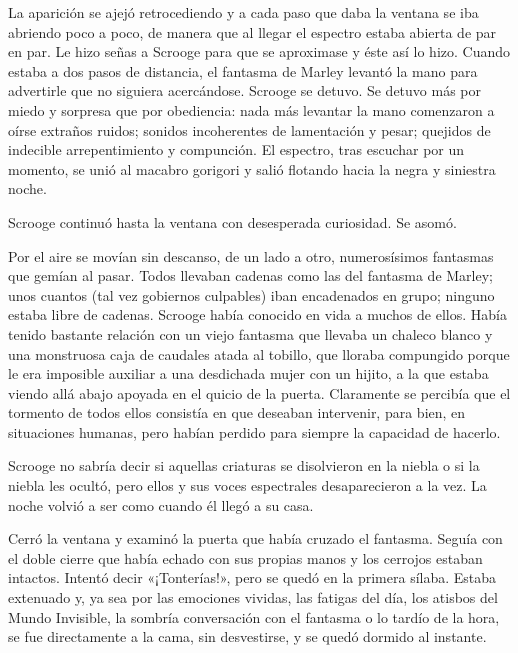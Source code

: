 \documentclass{novela}
\begin{document}
 La aparición se ajejó retrocediendo y a cada paso que daba la ventana se iba abriendo poco a poco, de manera que al llegar el espectro estaba abierta de par en par. Le hizo señas a Scrooge para que se aproximase y éste así lo hizo. Cuando estaba a dos pasos de distancia, el fantasma de Marley levantó la mano para advertirle que no siguiera acercándose. Scrooge se detuvo. Se detuvo más por miedo y sorpresa que por obediencia: nada más levantar la mano comenzaron a oírse extraños ruidos; sonidos incoherentes de lamentación y pesar; quejidos de indecible arrepentimiento y compunción. El espectro, tras escuchar por un momento, se unió al macabro gorigori y salió flotando hacia la negra y siniestra noche.

 Scrooge continuó hasta la ventana con desesperada curiosidad. Se asomó.

 Por el aire se movían sin descanso, de un lado a otro, numerosísimos fantasmas que gemían al pasar. Todos llevaban cadenas como las del fantasma de Marley; unos cuantos (tal vez gobiernos culpables) iban encadenados en grupo; ninguno estaba libre de cadenas. Scrooge había conocido en vida a muchos de ellos. Había tenido bastante relación con un viejo fantasma que llevaba un chaleco blanco y una monstruosa caja de caudales atada al tobillo, que lloraba compungido porque le era imposible auxiliar a una desdichada mujer con un hijito, a la que estaba viendo allá abajo apoyada en el quicio de la puerta. Claramente se percibía que el tormento de todos ellos consistía en que deseaban intervenir, para bien, en situaciones humanas, pero habían perdido para siempre la capacidad de hacerlo.

 Scrooge no sabría decir si aquellas criaturas se disolvieron en la niebla o si la niebla les ocultó, pero ellos y sus voces espectrales desaparecieron a la vez. La noche volvió a ser como cuando él llegó a su casa.

 Cerró la ventana y examinó la puerta que había cruzado el fantasma. Seguía con el doble cierre que había echado con sus propias manos y los cerrojos estaban intactos. Intentó decir «¡Tonterías!», pero se quedó en la primera sílaba. Estaba extenuado y, ya sea por las emociones vividas, las fatigas del día, los atisbos del Mundo Invisible, la sombría conversación con el fantasma o lo tardío de la hora, se fue directamente a la cama, sin desvestirse, y se quedó dormido al instante.





\end{document}
